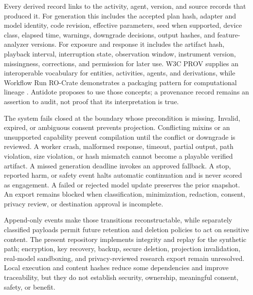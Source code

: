 Every derived record links to the activity, agent, version, and source records
that produced it. For generation this includes the accepted plan hash, adapter
and model identity, code revision, effective parameters, seed when supported,
device class, elapsed time, warnings, downgrade decisions, output hashes, and
feature-analyzer versions. For exposure and response it includes the artifact
hash, playback interval, interruption state, observation window, instrument
version, missingness, corrections, and permission for later use. W3C PROV
supplies an interoperable vocabulary for entities, activities, agents, and
derivations, while Workflow Run RO-Crate demonstrates a packaging pattern for
computational lineage \citep{moreau2013prov,leo2024rocrate}. Antidote proposes
to use those concepts; a provenance record remains an assertion to audit, not
proof that its interpretation is true.

The system fails closed at the boundary whose precondition is missing. Invalid,
expired, or ambiguous consent prevents projection. Conflicting mixins or an
unsupported capability prevent compilation until the conflict or downgrade is
reviewed. A worker crash, malformed response, timeout, partial output, path
violation, size violation, or hash mismatch cannot become a playable verified
artifact. A missed generation deadline invokes an approved fallback. A stop,
reported harm, or safety event halts automatic continuation and is never scored
as engagement. A failed or rejected model update preserves the prior snapshot.
An export remains blocked when classification, minimization, redaction,
consent, privacy review, or destination approval is incomplete.

Append-only events make those transitions reconstructable, while separately
classified payloads permit future retention and deletion policies to act on
sensitive content. The present repository implements integrity and replay for
the synthetic path; encryption, key recovery, backup, secure deletion,
projection invalidation, real-model sandboxing, and privacy-reviewed research
export remain unresolved. Local execution and content hashes reduce some
dependencies and improve traceability, but they do not establish security,
ownership, meaningful consent, safety, or benefit.

